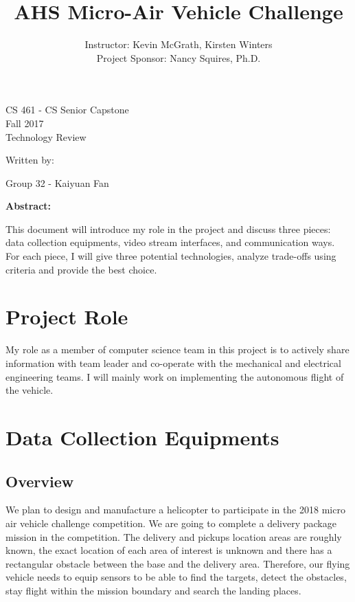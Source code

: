 \documentclass[letterpaper, 10, draftclsnofoot, onecolumn,compsoc]{IEEEtran}
\title{AHS Micro-Air Vehicle Challenge}
\author{ Instructor: Kevin McGrath, Kirsten Winters \\
    Project Sponsor: Nancy Squires, Ph.D.
}
\def\class{CS 461 - CS Senior Capstone}
\def\term{Fall 2017}
\begin{document}
\null  
\nointerlineskip  %
\vfill
\let\snewpage \newpage
\let\newpage \relax
\maketitle
\begin{center}
\class\\
\term\\
\huge{Technology Review}\par
\vspace{2mm}
\large{Written by:}\par
\normalsize{Group 32 - Kaiyuan Fan}\par
\vspace{8mm}
\large{\textbf{Abstract:}}\par 
\end{center}
\vspace{2mm}
\normalsize{ This document will introduce my role in the project and discuss three pieces: data collection equipments, video stream interfaces, and communication ways. For each piece, I will give three potential technologies, analyze trade-offs using criteria and provide the best choice.
}

\let \newpage \snewpage
\vfill 
\break %

\tableofcontents

\newpage
\section{Project Role}
My role as a member of computer science team in this project is to actively share information with team leader and co-operate with the mechanical and electrical engineering teams. I will mainly work on implementing the autonomous flight of the vehicle.
\section{Data Collection Equipments}
\subsection{Overview}
We plan to design and manufacture a helicopter to participate in the 2018 micro air vehicle challenge competition. We are going to complete a delivery package mission in the competition. The delivery and pickups location areas are roughly known, the exact location of each area of interest is unknown and there has a rectangular obstacle between the base and the delivery area. Therefore, our flying vehicle needs to equip sensors to be able to find the targets, detect the obstacles, stay flight within the mission boundary and search the landing places.
\end{document}
